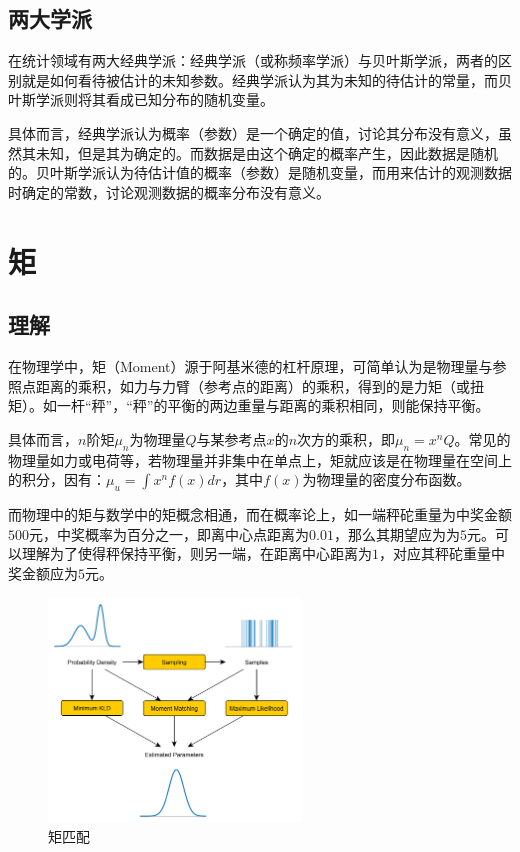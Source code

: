 \documentclass[11pt]{article}
\begin{document}
\subsection{两大学派}

在统计领域有两大经典学派：经典学派（或称频率学派）与贝叶斯学派，两者的区别就是如何看待被估计的未知参数。经典学派认为其为未知的待估计的常量，而贝叶斯学派则将其看成已知分布的随机变量。

具体而言，经典学派认为概率（参数）是一个确定的值，讨论其分布没有意义，虽然其未知，但是其为确定的。而数据是由这个确定的概率产生，因此数据是随机的。贝叶斯学派认为待估计值的概率（参数）是随机变量，而用来估计的观测数据时确定的常数，讨论观测数据的概率分布没有意义。

\section{矩}

\subsection{理解}

在物理学中，矩（Moment）源于阿基米德的杠杆原理，可简单认为是物理量与参照点距离的乘积，如力与力臂（参考点的距离）的乘积，得到的是力矩（或扭矩）。如一杆“秤”，“秤”的平衡的两边重量与距离的乘积相同，则能保持平衡。

具体而言，$n$阶矩$\mu_n$为物理量$Q$与某参考点$x$的$n$次方的乘积，即$\mu_n = x^n Q$。常见的物理量如力或电荷等，若物理量并非集中在单点上，矩就应该是在物理量在空间上的积分，因有：$\mu_u = \int x^n f(x) dr$，其中$f(x)$为物理量的密度分布函数。

而物理中的矩与数学中的矩概念相通，而在概率论上，如一端秤砣重量为中奖金额$500$元，中奖概率为百分之一，即离中心点距离为$0.01$，那么其期望应为为$5$元。可以理解为了使得秤保持平衡，则另一端，在距离中心距离为$1$，对应其秤砣重量中奖金额应为$5$元。

\begin{figure}[H]
    \centering
    \includegraphics[width=0.6\textwidth]{fig/moment-matching.png}
    \caption{矩匹配}
    \label{fig:moment-match}
\end{figure}
\end{document}
